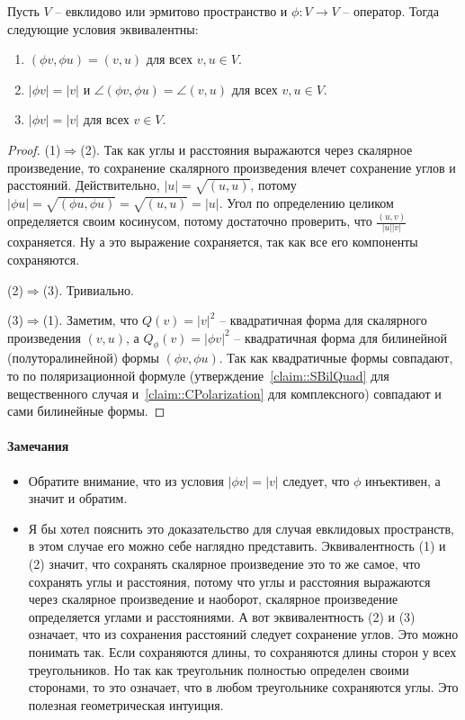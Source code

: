 \begin{claim}
Пусть $V$ -- евклидово или эрмитово пространство и $\phi\colon V\to V$ -- оператор.
Тогда следующие условия эквивалентны:
\begin{enumerate}
\item $(\phi v, \phi u) = (v, u)$ для всех $v, u\in V$.

\item $|\phi v| = |v|$ и $\angle(\phi v, \phi u) = \angle(v, u)$ для всех $v, u\in V$.

\item $|\phi v| = |v|$ для всех $v\in V$.
\end{enumerate}
\end{claim}
\begin{proof}
(1)$\Rightarrow$(2).
Так как углы и расстояния выражаются через скалярное произведение, то сохранение скалярного произведения влечет сохранение углов и расстояний.
Действительно, $|u| = \sqrt{(u,u)}$, потому $|\phi u| = \sqrt{(\phi u, \phi u)} = \sqrt{(u,u)}= |u|$.
Угол по определению целиком определяется своим косинусом, потому достаточно проверить, что $\frac{(u,v)}{|u| |v|}$ сохраняется.
Ну а это выражение сохраняется, так как все его компоненты сохраняются.


(2)$\Rightarrow$(3).
Тривиально.

(3)$\Rightarrow$(1).
Заметим, что $Q(v) = |v|^2$ -- квадратичная форма для скалярного произведения $(v,u)$, а $Q_\phi(v) = |\phi v|^2$ -- квадратичная форма для билинейной (полуторалинейной) формы $(\phi v, \phi u)$.
Так как квадратичные формы совпадают, то по поляризационной формуле (утверждение~\ref{claim::SBilQuad} для вещественного случая и~\ref{claim::CPolarization} для комплексного) совпадают и сами билинейные формы.
\end{proof}

\paragraph{Замечания}

\begin{itemize}
\item Обратите внимание, что из условия $|\phi v| = |v|$ следует, что $\phi$ инъективен, а значит и обратим.

\item Я бы хотел пояснить это доказательство для случая евклидовых пространств, в этом случае его можно себе наглядно представить.
Эквивалентность (1) и (2) значит, что сохранять скалярное произведение это то же самое, что сохранять углы и расстояния, потому что углы и расстояния выражаются через скалярное произведение и наоборот, скалярное произведение определяется углами и расстояниями.
А вот эквивалентность (2) и (3) означает, что из сохранения расстояний следует сохранение углов.
Это можно понимать так.
Если сохраняются длины, то сохраняются длины сторон у всех треугольников.
Но так как треугольник полностью определен своими сторонами, то это означает, что в любом треугольнике сохраняются углы.
Это полезная геометрическая интуиция.
\end{itemize}

